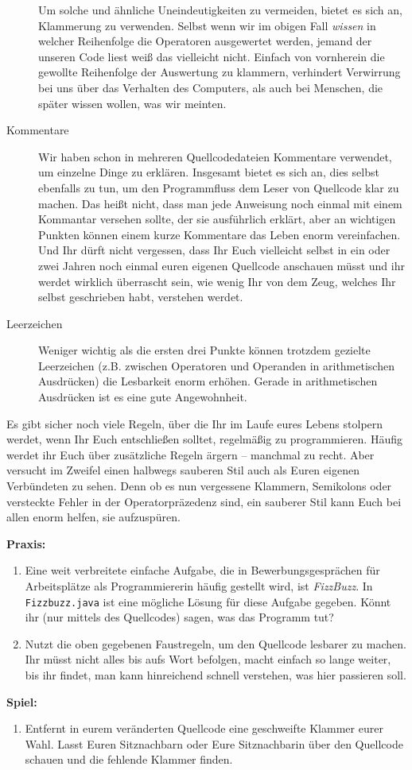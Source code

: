 \begin{description}
  Um solche und ähnliche Uneindeutigkeiten zu vermeiden, bietet es sich an,
  Klammerung zu verwenden. Selbst wenn wir im obigen Fall \emph{wissen} in
  welcher Reihenfolge die Operatoren ausgewertet werden, jemand der unseren Code
  liest weiß das vielleicht nicht. Einfach von vornherein die gewollte
  Reihenfolge der Auswertung zu klammern, verhindert Verwirrung bei uns über das
  Verhalten des Computers, als auch bei Menschen, die später wissen wollen, was
  wir meinten.
\item[Kommentare]
  Wir haben schon in mehreren Quellcodedateien Kommentare verwendet, um einzelne
  Dinge zu erklären. Insgesamt bietet es sich an, dies selbst ebenfalls zu tun,
  um den Programmfluss dem Leser von Quellcode klar zu machen. Das heißt nicht,
  dass man jede Anweisung noch einmal mit einem Kommantar versehen sollte, der
  sie ausführlich erklärt, aber an wichtigen Punkten können einem kurze
  Kommentare das Leben enorm vereinfachen. Und Ihr dürft nicht vergessen, dass
  Ihr Euch vielleicht selbst in ein oder zwei Jahren noch einmal euren eigenen
  Quellcode anschauen müsst und ihr werdet wirklich überrascht sein, wie wenig
  Ihr von dem Zeug, welches Ihr selbst geschrieben habt, verstehen werdet.
\item[Leerzeichen]
  Weniger wichtig als die ersten drei Punkte können trotzdem gezielte
  Leerzeichen (z.B. zwischen Operatoren und Operanden in arithmetischen
  Ausdrücken) die Lesbarkeit enorm erhöhen. Gerade in arithmetischen Ausdrücken
  ist es eine gute Angewohnheit.
\end{description}

Es gibt sicher noch viele Regeln, über die Ihr im Laufe eures Lebens stolpern
werdet, wenn Ihr Euch entschließen solltet, regelmäßig zu programmieren. Häufig
werdet ihr Euch über zusätzliche Regeln ärgern -- manchmal zu recht. Aber
versucht im Zweifel einen halbwegs sauberen Stil auch als Euren eigenen
Verbündeten zu sehen. Denn ob es nun vergessene Klammern, Semikolons oder
versteckte Fehler in der Operatorpräzedenz sind, ein sauberer Stil kann Euch bei
allen enorm helfen, sie aufzuspüren.

\textbf{Praxis:}
\begin{enumerate}
\item Eine weit verbreitete einfache Aufgabe, die in Bewerbungsgesprächen für
  Arbeitsplätze als Programmiererin häufig gestellt wird, ist \emph{FizzBuzz}.
  In \texttt{Fizzbuzz.java} ist eine mögliche Lösung für diese Aufgabe gegeben.
  Könnt ihr (nur mittels des Quellcodes) sagen, was das Programm tut?
\item Nutzt die oben gegebenen Faustregeln, um den Quellcode lesbarer zu machen.
  Ihr müsst nicht alles bis aufs Wort befolgen, macht einfach so lange weiter,
  bis ihr findet, man kann hinreichend schnell verstehen, was hier passieren
  soll.
\end{enumerate}


\textbf{Spiel:}
\begin{enumerate}
\item Entfernt in eurem veränderten Quellcode eine geschweifte Klammer eurer
  Wahl. Lasst Euren Sitznachbarn oder Eure Sitznachbarin über den Quellcode
  schauen und die fehlende Klammer finden.
\end{enumerate}
